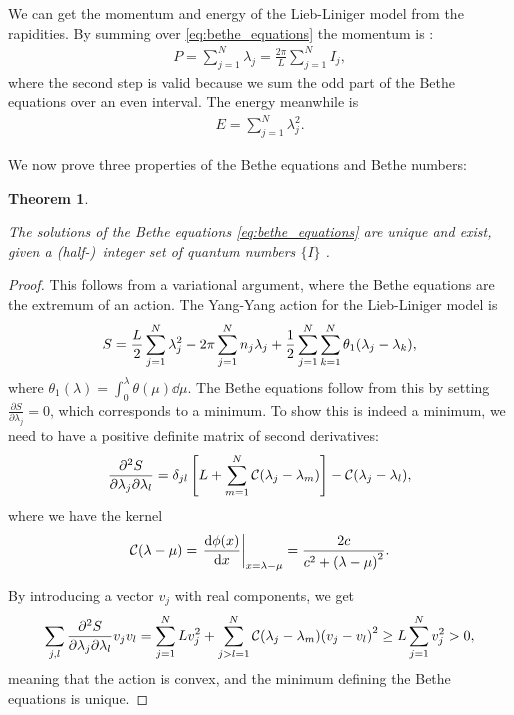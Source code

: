 \documentclass[11pt, a4paper]{report} %
\newtheorem{theorem}{Theorem}
\begin{document}
We can get the momentum and energy of the Lieb-Liniger model from the rapidities. By summing over \cref{eq:bethe_equations} the momentum is :
\begin{align}
  P = \sum_{j=1}^N \lambda_j = \frac{2\pi}{L}\sum_{j=1}^N I_j,
\end{align}
where the second step is valid because we sum the odd part of the Bethe equations over an even interval.
The energy meanwhile is~\cite{Korepin1993}
\begin{align}
  E = \sum_{j=1}^{N}\lambda_j^2.
\end{align}

We now prove three properties of the Bethe equations and Bethe numbers:

\begin{theorem}\label{th:convexity}
\begin{sloppypar}
\noindent
The solutions of the Bethe equations \cref{eq:bethe_equations} are unique and exist, given a \mbox{(half-) integer} set of quantum numbers \(\{I\}\) \textup{\cite{Yang1969}}.
\end{sloppypar}
\end{theorem}
\begin{proof}
This follows from a variational argument, where the Bethe equations are the extremum of an action.
The Yang-Yang action for the Lieb-Liniger model is
\begin{align}
	S= \frac{L}{2} \sum_{j=1}^{N} \lambda_j^2 - 2\pi\sum_{j=1}^{N} n_j \lambda_j + \frac{1}{2} \sum_{j=1}^N \sum_{k=1}^{N} \theta_1\qty(\lambda_j - \lambda_k),
\end{align}
where \(\theta_1(\lambda) = \int_0^{\lambda} \theta(\mu)\dd\mu\).
The Bethe equations follow from this by setting \(\frac{\partial S}{\partial \lambda_j} = 0\), which corresponds to a minimum.
To show this is indeed a minimum, we need to have a positive definite matrix of second derivatives:
\begin{align}
	\frac{\partial^2S}{\partial\lambda_j\partial\lambda_l} = \delta_{jl} \left[L + \sum_{m=1}^{N} \mathcal{C}\qty(\lambda_j-\lambda_m)\right] - \mathcal{C}\qty(\lambda_j- \lambda_l),
\end{align}
where we have the kernel
\begin{align}
	\mathcal{C}(\lambda - \mu) = \eval{\frac{\dd \phi(x)}{\dd x}}_{x=\lambda-\mu} = \frac{2c}{c^2 + {(\lambda - \mu)}^2}.
\end{align}

By introducing a vector \(v_j\) with real components, we get~\cite{Korepin1993}
\begin{align}
  	\sum_{j,l}\frac{\partial^2S}{\partial\lambda_j \partial\lambda_l} v_j v_l = \sum_{j=1}^N L v_{j}^2 + \sum_{j>l=1}^{N} \mathcal{C}\qty(\lambda_j-\lambda_m) {\qty(v_j - v_l)}^2 \geq L \sum_{j=1}^N v_j^{2} > 0,
\end{align}
meaning that the action is convex, and the minimum defining the Bethe equations is unique.
\end{proof}
\end{document}
